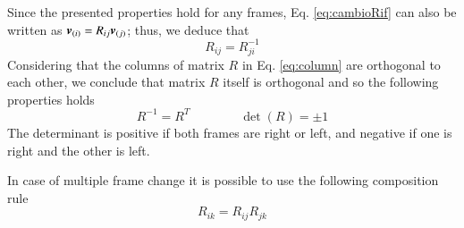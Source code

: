 Since the presented properties hold for any frames, Eq. \ref{eq:cambioRif} can also be written as ${\boldsymbol{v}}_{(i)} = R_{ij} {\boldsymbol{v}}_{(j)}$; thus, we deduce  that
\begin{equation}
    R_{ij}=R_{ji}^{-1}
    \label{eq:inverseR}
\end{equation}
Considering that the columns of matrix $R$ in Eq. \ref{eq:column} are orthogonal to each other, we conclude that matrix $R$ itself is orthogonal and so the following properties holds
\begin{equation}
    R^{-1}=R^T \qquad\qquad \det(R)=\pm 1
    \label{eq:RiRT}
\end{equation}
The determinant is positive if both frames are right or left, and negative if one is right and the other is left.

In case of multiple frame change it is possible to use the following composition rule
\begin{equation}
    R_{ik} = R_{ij} R_{jk}
    \label{eq:MultiR}
\end{equation}


